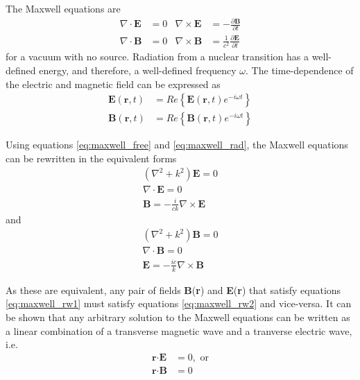 The Maxwell equations are
\begin{subequations}
\label{eq:maxwell_free}
\begin{align}
    \nabla \cdot \textbf{E} & = 0 &   \nabla \times \textbf{E} & = -\frac{\partial \textbf{B}}{\partial t} \\
     \nabla \cdot \textbf{B} & = 0 &  \nabla \times \textbf{B} & = \frac{1}{c^2}\frac{\partial \textbf{E}}{\partial t}
\end{align}
\end{subequations}
for a vacuum with no source. Radiation from a nuclear transition has a well-defined energy, and therefore, a well-defined frequency $\omega$. The time-dependence of the electric and magnetic field can be expressed as
\begin{subequations}
\label{eq:maxwell_rad}
\begin{align}
    \textbf{E}(\textbf{r},t) & = Re\left\{\textbf{E}(\textbf{r},t)e^{-i\omega t}\right\} \\
    \textbf{B}(\textbf{r},t) & = Re\left\{\textbf{B}(\textbf{r},t)e^{-i\omega t}\right\}
\end{align}
\end{subequations}
 
Using equations \ref{eq:maxwell_free} and \ref{eq:maxwell_rad}, the Maxwell equations can be rewritten in the equivalent forms
\begin{subequations}
\label{eq:maxwell_rw1}
\begin{gather}
    \left(\nabla^2+k^2\right)\textbf{E} = 0 \\
    \nabla \cdot \textbf{E} = 0 \\
    \textbf{B}=-\frac{i}{ck} \nabla \times \textbf{E}
\end{gather}
\end{subequations}
and
\begin{subequations}
\label{eq:maxwell_rw2}
\begin{gather}
    \left(\nabla^2+k^2\right)\textbf{B} = 0 \\
    \nabla \cdot \textbf{B} = 0 \\
    \textbf{E}=-\frac{ic}{k} \nabla \times \textbf{B}
\end{gather}
\end{subequations}

As these are equivalent, any pair of fields \textbf{B}(\textbf{r}) and \textbf{E}(\textbf{r}) that satisfy equations \ref{eq:maxwell_rw1} must satisfy equations \ref{eq:maxwell_rw2} and vice-versa. It can be shown that any arbitrary solution to the Maxwell equations can be written as a linear combination of a transverse magnetic wave and a tranverse electric wave, i.e. 
\begin{align}
    \label{eq:trans_E}
    \textbf{r} \cdot \textbf{E} & = 0, \text{ or} \\
    \label{eq:trans_B}
    \textbf{r} \cdot \textbf{B} & = 0
\end{align}

